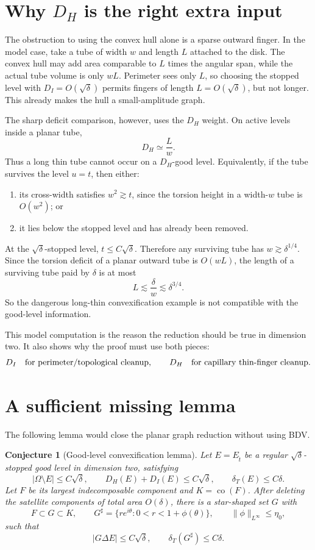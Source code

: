 \documentclass[11pt]{article}
\newtheorem{conjecture}[theorem]{Conjecture}
\newcommand{\Om}{\Omega}
\newcommand{\dT}{\delta_T}
\newcommand{\Et}{E_{\hat t}}
\begin{document}
\section{Why \(D_H\) is the right extra input}

The obstruction to using the convex hull alone is a sparse outward finger.
In the model case, take a tube of width \(w\) and length \(L\) attached to the
disk.  The convex hull may add area comparable to \(L\) times the angular span,
while the actual tube volume is only \(wL\).  Perimeter sees only \(L\), so
choosing the stopped level with \(D_I=O(\sqrt\delta)\) permits fingers of
length \(L=O(\sqrt\delta)\), but not longer.  This already makes the hull a
small-amplitude graph.

The sharp deficit comparison, however, uses the \(D_H\) weight.  On active
levels inside a planar tube,
\[
   D_H \simeq \frac{L}{w}.
   \tag{5.1}
\]
Thus a long thin tube cannot occur on a \(D_H\)-good level.  Equivalently, if
the tube survives the level \(u=t\), then either:
\begin{enumerate}[label=\arabic*.]
\item its cross-width satisfies \(w^2\gtrsim t\), since the torsion height in
a width-\(w\) tube is \(O(w^2)\); or
\item it lies below the stopped level and has already been removed.
\end{enumerate}
At the \(\sqrt\delta\)-stopped level, \(t\le C\sqrt\delta\).  Therefore any
surviving tube has \(w\gtrsim \delta^{1/4}\).  Since the torsion deficit of a
planar outward tube is \(O(wL)\), the length of a surviving tube paid by
\(\delta\) is at most
\[
   L\lesssim \frac{\delta}{w}\lesssim \delta^{3/4}.
\]
So the dangerous long-thin convexification example is not compatible with the
good-level information.

This model computation is the reason the reduction should be true in
dimension two.  It also shows why the proof must use both pieces:
\[
   D_I \quad\hbox{for perimeter/topological cleanup},\qquad
   D_H \quad\hbox{for capillary thin-finger cleanup}.
\]

\section{A sufficient missing lemma}

The following lemma would close the planar graph reduction without using BDV.

\begin{conjecture}[Good-level convexification lemma]\label{conj:convexify}
Let \(E=\Et\) be a regular \(\sqrt\delta\)-stopped good level in dimension
two, satisfying
\[
   |\Om\setminus E|\le C\sqrt\delta,\qquad
   D_H(E)+D_I(E)\le C\sqrt\delta,\qquad
   \dT(E)\le C\delta.
\]
Let \(F\) be its largest indecomposable component and \(K=\operatorname{co}(F)\).
After deleting the satellite components of total area \(O(\delta)\), there is
a star-shaped set \(G\) with
\[
   F\subset G\subset K,\qquad
   G^\sharp=\{r e^{i\theta}:0<r<1+\phi(\theta)\},
   \qquad
   \|\phi\|_{L^\infty}\le \eta_0,
\]
such that
\[
   |G\Delta E|\le C\sqrt\delta,
   \qquad
   \dT(G^\sharp)\le C\delta.
   \tag{6.1}
\]
\end{conjecture}
\end{document}
